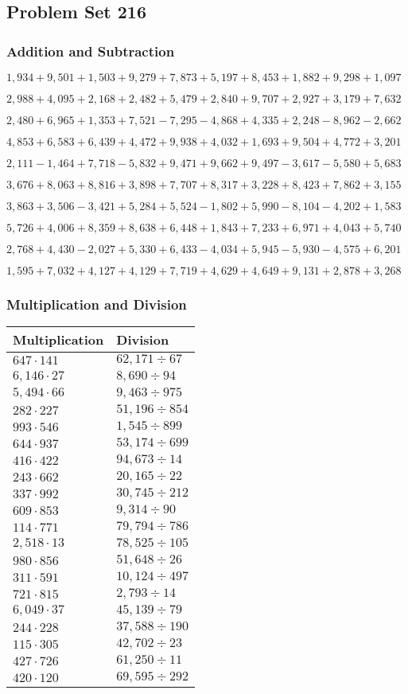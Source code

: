 \hypertarget{problem-set-216}{%
\subsection{Problem Set 216}\label{problem-set-216}}

\hypertarget{addition-and-subtraction}{%
\subsubsection{Addition and
Subtraction}\label{addition-and-subtraction}}

\(1,934+9,501+1,503+9,279+7,873+5,197+8,453+1,882+9,298+1,097\)

\(2,988+4,095+2,168+2,482+5,479+2,840+9,707+2,927+3,179+7,632\)

\(2,480+6,965+1,353+7,521-7,295-4,868+4,335+2,248-8,962-2,662\)

\(4,853+6,583+6,439+4,472+9,938+4,032+1,693+9,504+4,772+3,201\)

\(2,111-1,464+7,718-5,832+9,471+9,662+9,497-3,617-5,580+5,683\)

\(3,676+8,063+8,816+3,898+7,707+8,317+3,228+8,423+7,862+3,155\)

\(3,863+3,506-3,421+5,284+5,524-1,802+5,990-8,104-4,202+1,583\)

\(5,726+4,006+8,359+8,638+6,448+1,843+7,233+6,971+4,043+5,740\)

\(2,768+4,430-2,027+5,330+6,433-4,034+5,945-5,930-4,575+6,201\)

\(1,595+7,032+4,127+4,129+7,719+4,629+4,649+9,131+2,878+3,268\)

\hypertarget{multiplication-and-division}{%
\subsubsection{Multiplication and
Division}\label{multiplication-and-division}}

\begin{longtable}[]{@{}ll@{}}
\toprule
Multiplication & Division\tabularnewline
\midrule
\endhead
\(647\cdot141\) & \(62,171÷67\)\tabularnewline
\(6,146\cdot27\) & \(8,690÷94\)\tabularnewline
\(5,494\cdot66\) & \(9,463÷975\)\tabularnewline
\(282\cdot227\) & \(51,196÷854\)\tabularnewline
\(993\cdot546\) & \(1,545÷899\)\tabularnewline
\(644\cdot937\) & \(53,174÷699\)\tabularnewline
\(416\cdot422\) & \(94,673÷14\)\tabularnewline
\(243\cdot662\) & \(20,165÷22\)\tabularnewline
\(337\cdot992\) & \(30,745÷212\)\tabularnewline
\(609\cdot853\) & \(9,314÷90\)\tabularnewline
\(114\cdot771\) & \(79,794÷786\)\tabularnewline
\(2,518\cdot13\) & \(78,525÷105\)\tabularnewline
\(980\cdot856\) & \(51,648÷26\)\tabularnewline
\(311\cdot591\) & \(10,124÷497\)\tabularnewline
\(721\cdot815\) & \(2,793÷14\)\tabularnewline
\(6,049\cdot37\) & \(45,139÷79\)\tabularnewline
\(244\cdot228\) & \(37,588÷190\)\tabularnewline
\(115\cdot305\) & \(42,702÷23\)\tabularnewline
\(427\cdot726\) & \(61,250÷11\)\tabularnewline
\(420\cdot120\) & \(69,595÷292\)\tabularnewline
\bottomrule
\end{longtable}

